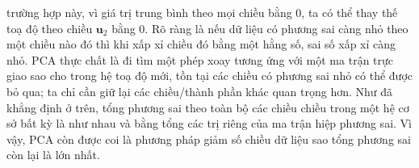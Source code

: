 trường hợp này, vì giá trị trung bình theo mọi chiều bằng 0, ta có thể thay thế
toạ độ theo chiều $\mathbf{u}_2$ bằng 0. Rõ ràng là nếu dữ liệu có phương sai
càng nhỏ theo một chiều nào đó thì khi xấp xỉ chiều đó bằng một hằng số, sai số
xấp xỉ càng nhỏ. PCA thực chất là đi tìm một phép xoay tương ứng với một ma trận
trực giao sao cho trong hệ toạ độ mới, tồn tại các chiều có phương sai nhỏ
có thể được bỏ qua; ta chỉ cần giữ lại các chiều/thành phần khác quan trọng hơn. Như
đã khẳng định ở trên, tổng phương sai theo toàn bộ các chiều chiều trong một hệ cơ sở bất kỳ là
như nhau và bằng tổng các trị riêng của ma trận hiệp phương sai. Vì vậy, PCA còn
được coi là phương pháp giảm số chiều dữ liệu sao tổng phương sai còn lại là lớn
nhất.
 
 
 
 
 
 
 
